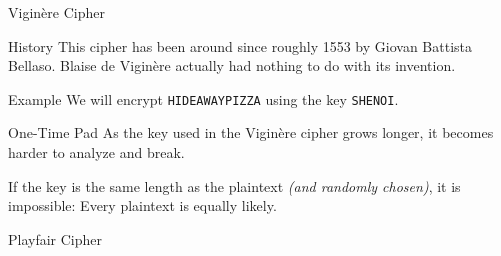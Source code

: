 \documentclass{beamer}
\begin{document}
\begin{frame}{Vigin\`ere Cipher}
	\begin{block}{History}
		This cipher has been around since roughly 1553 by Giovan Battista
		Bellaso. Blaise de Vigin\`ere actually had nothing to do with its
		invention.
	\end{block}
	\begin{block}{Example}
		We will encrypt {\tt HIDEAWAYPIZZA} using the key {\tt SHENOI}.
	\end{block}
\end{frame}

\begin{frame}{One-Time Pad}
	As the key used in the Vigin\`ere cipher grows longer, it becomes harder to
	analyze and break.

	If the key is the same length as the plaintext {\it (and randomly chosen)},
	it is impossible: Every plaintext is equally likely.

\end{frame}

\begin{frame}{Playfair Cipher}
\end{frame}
\end{document}
